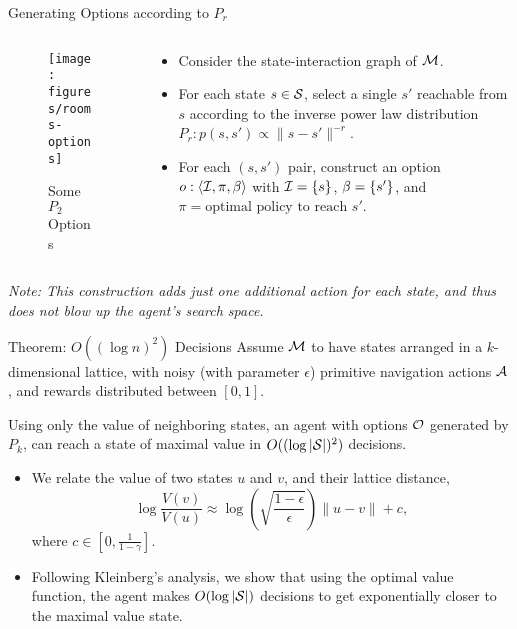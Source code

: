 \vfill
\begin{block}{Generating Options according to $P_r$}
    \begin{columns}
        \begin{column}{.39\textwidth}
            \begin{figure}[h]
                \centering
                \texttt{[image: figures/rooms-options]}
                \label{fig:rooms-options}
                \caption{Some $P_2$ Options}
            \end{figure}
        \end{column}
        \begin{column}{.49\textwidth}                
            \begin{itemize}
                \item Consider the state-interaction graph of $\mathcal{M}$. 
                \item For each state $s \in \mathcal{S}$, select a single $s'$
                    reachable from $s$ according to the inverse power law
                    distribution $P_r : p(s,s') \propto \|s - s'\|^{-r}$.
                \item For each $(s,s')$ pair, construct an option $o:\langle  \mathcal{I},\pi,\beta \rangle$
                    with $\mathcal{I} = \{s\}$, $\beta = \{s'\}$, and $\pi =
                    \mbox{optimal policy to reach $s'$}$.
            \end{itemize}
        \end{column}
    \end{columns}

    {\em Note: This construction adds just one additional action for each state,
    and thus does not blow up the agent's search space.}

\end{block}

\vfill
\begin{block}{Theorem: $O( (\log n)^2 )$ Decisions}
    Assume $\mathcal{M}$ to have states arranged in a $k$-dimensional lattice, with
    noisy (with parameter $\epsilon$) primitive navigation actions $\mathcal{A}$,
    and rewards distributed between $[0,1]$.

    Using only the value of neighboring states, an agent with options $\mathcal{O}$
    generated by $P_k$, can reach a state of maximal value in $O( ( \log
    |\mathcal{S}| )^2)$ decisions.

    \begin{itemize}
        \item We relate the value of two states $u$ and $v$, and their lattice distance,
            $$ \log \frac{ V(v) }{ V(u) } \approx \log( \sqrt{ \frac{1 - \epsilon}{ \epsilon } } ) \|u - v\| + c,$$ 
            where $c \in [0,\frac{1}{1-\gamma}]$.
        \item Following Kleinberg's analysis, we show that using the optimal
            value function, the agent makes $O(\log |\mathcal{S}|)$ decisions to get
            exponentially closer to the maximal value state. 
    \end{itemize}

\end{block}
